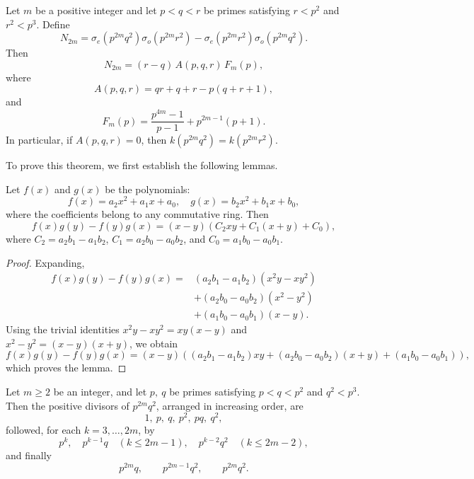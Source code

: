 \documentclass[12pt,reqno]{article}
\begin{document}
\begin{theorem}\label{thm:factorization}
Let \(m\) be a positive integer and let \(p<q<r\) be primes satisfying $r<p^2$ and $r^2<p^3$.
Define
\[
N_{2m}
=
\sigma_e(p^{2m}q^2)\sigma_o(p^{2m}r^2)
-
\sigma_e(p^{2m}r^2)\sigma_o(p^{2m}q^2).
\]
Then
\[
N_{2m}
=
(r-q)\,
A(p,q,r)\,
F_m(p),
\]
where
\[
A(p,q,r)=qr+q+r-p(q+r+1),
\]
and
\[
F_m(p)
=
\frac{p^{4m}-1}{p-1}+p^{2m-1}(p+1).
\]
In particular, if $A(p,q,r)=0$, then $k(p^{2m}q^2)=k(p^{2m}r^2)$.
\end{theorem}

To prove this theorem, we first establish the following lemmas.
\begin{lemma}\label{lem:determinant}
Let $f(x)$ and $g(x)$ be the polynomials:
\[
f(x)=a_2x^2+a_1x+a_0,\quad
g(x)=b_2x^2+b_1x+b_0,
\]
where the coefficients belong to any commutative ring. Then
\[
f(x)g(y)-f(y)g(x)
=
(x-y)
\left(
C_2xy+C_1(x+y)+C_0
\right),
\]
where
$C_2=a_2b_1-a_1b_2$, $C_1=a_2b_0-a_0b_2$, and $C_0=a_1b_0-a_0b_1$.
\end{lemma}

\begin{proof}
Expanding,
\[
\begin{aligned}
f(x)g(y)-f(y)g(x)
={}&(a_2b_1-a_1b_2)(x^2y-xy^2)\\
&+(a_2b_0-a_0b_2)(x^2-y^2)\\
&+(a_1b_0-a_0b_1)(x-y).
\end{aligned}
\]
Using the trivial identities $x^2y-xy^2=xy(x-y)$ and $x^2-y^2=(x-y)(x+y)$, we obtain
\[
f(x)g(y)-f(y)g(x)
=(x-y)\left(
(a_2b_1-a_1b_2)xy
+(a_2b_0-a_0b_2)(x+y)
+(a_1b_0-a_0b_1)
\right),
\]
which proves the lemma.
\end{proof}

\begin{lemma}\label{lem:order}
Let \(m\ge2\) be an integer, and let \(p,\ q\) be primes satisfying $p<q<p^2$ and $q^2<p^3$.
Then the positive divisors of \(p^{2m}q^2\), arranged in increasing order, are
\[
1,\ p,\ q,\ p^2,\ pq,\ q^2,
\]
followed, for each \(k=3,\ldots,2m\), by
\[
p^k,\quad
p^{k-1}q\quad (k\le 2m-1),\quad
p^{k-2}q^2\quad (k\le 2m-2),
\]
and finally
\[
p^{2m}q,\qquad
p^{2m-1}q^2,\qquad
p^{2m}q^2.
\]
\end{lemma}
\end{document}
